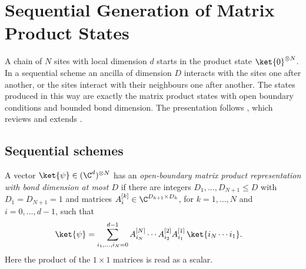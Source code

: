 
\chapter{Sequential Generation of Matrix Product States}\label{ch:sequential_generation}

A chain of $N$ sites with local dimension $d$ starts in the product state
$\ket{0}^{\otimes N}$. In a sequential scheme an ancilla of dimension $D$
interacts with the sites one after another, or the sites interact with their
neighbours one after another. The states produced in this way are exactly the
matrix product states with open boundary conditions and bounded bond
dimension. The presentation follows \cite[Section~5]{PerezGarcia2007Matrix},
which reviews and extends \cite{Schoen2005Sequential}.

\section{Sequential schemes}

\begin{definition}
    \label{def:obc_mps_bond_bound}
    A vector $\ket{\psi}\in(\C^d)^{\otimes N}$ has an \emph{open-boundary matrix
        product representation with bond dimension at most $D$} if there are
    integers $D_1,\dots,D_{N+1}\le D$ with $D_1=D_{N+1}=1$ and matrices
    $A^{[k]}_i\in\C^{D_{k+1}\times D_k}$, for $k=1,\dots,N$ and $i=0,\dots,d-1$,
    such that
    \begin{align}
        \ket{\psi}
         & =\sum_{i_1,\dots,i_N=0}^{d-1}
        A^{[N]}_{i_N}\cdots A^{[2]}_{i_2}A^{[1]}_{i_1}\,
        \ket{i_N\cdots i_1}.
        \label{eq:obc_mps_bond_bound}
    \end{align}
    Here the product of the $1\times 1$ matrices is read as a scalar.
\end{definition}

